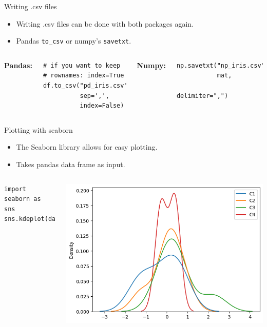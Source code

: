 \documentclass[compress%
,aspectratio=169%
]{beamer}
\newcommand{\code}{\lstinline}
\begin{document}
\begin{frame}[fragile]{Writing .csv files}
\begin{itemize}
    \item Writing .csv files can be done with both packages again.
    \item Pandas \code{to_csv} or numpy's \code{savetxt}.
\end{itemize}
\vspace{0.5cm}
\begin{columns}

\textbf{Pandas:}
\begin{lstlisting}
# if you want to keep 
# rownames: index=True
df.to_csv("pd_iris.csv", 
          sep=',',
          index=False)
\end{lstlisting}

\textbf{Numpy:}
\begin{lstlisting}
np.savetxt("np_iris.csv", 
           mat, 
           delimiter=",")
\end{lstlisting}
\end{columns}

\end{frame}

\begin{frame}[fragile]{Plotting with seaborn}
\begin{itemize}
    \item The Seaborn library allows for easy plotting.
    \item Takes pandas data frame as input.
\end{itemize}

\begin{columns}
    
\begin{lstlisting}
import seaborn as sns
sns.kdeplot(data=df)
\end{lstlisting}

\includegraphics[width = \linewidth]{mpimgbeamertheme/img/kdeplot.png}

\end{columns}

\end{frame}
\end{document}
